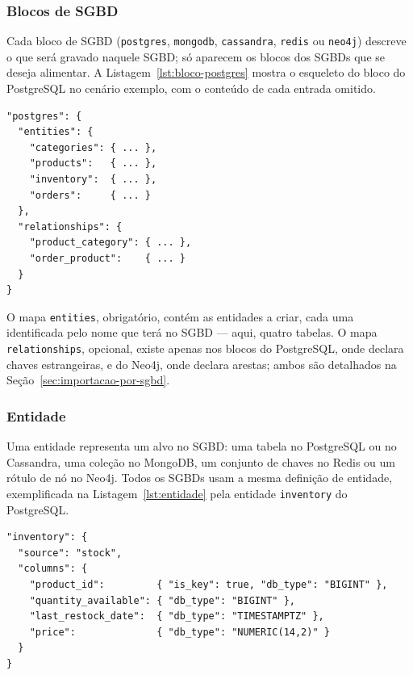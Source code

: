 \subsubsection{Blocos de SGBD}
\label{sec:blocos-sgbd}

Cada bloco de SGBD (\texttt{postgres}, \texttt{mongodb}, \texttt{cassandra},
\texttt{redis} ou \texttt{neo4j}) descreve o que será gravado naquele SGBD; só aparecem os
blocos dos SGBDs que se deseja alimentar. A Listagem~\ref{lst:bloco-postgres} mostra o
esqueleto do bloco do PostgreSQL no cenário exemplo, com o conteúdo de cada entrada
omitido.

\begin{lstlisting}[style=jsonstyle,caption={Esqueleto do bloco \texttt{postgres} do arquivo de importação.},label={lst:bloco-postgres}]
"postgres": {
  "entities": {
    "categories": { ... },
    "products":   { ... },
    "inventory":  { ... },
    "orders":     { ... }
  },
  "relationships": {
    "product_category": { ... },
    "order_product":    { ... }
  }
}
\end{lstlisting}

O mapa \texttt{entities}, obrigatório, contém as entidades a criar, cada uma identificada
pelo nome que terá no SGBD --- aqui, quatro tabelas. O mapa \texttt{relationships},
opcional, existe apenas nos blocos do PostgreSQL, onde declara chaves estrangeiras, e do
Neo4j, onde declara arestas; ambos são detalhados na Seção~\ref{sec:importacao-por-sgbd}.

\subsubsection{Entidade}
\label{sec:entidade}

Uma entidade representa um alvo no SGBD: uma tabela no PostgreSQL ou no Cassandra, uma
coleção no MongoDB, um conjunto de chaves no Redis ou um rótulo de nó no Neo4j. Todos os
SGBDs usam a mesma definição de entidade, exemplificada na Listagem~\ref{lst:entidade}
pela entidade \texttt{inventory} do PostgreSQL.

\begin{lstlisting}[style=jsonstyle,caption={Entidade \texttt{inventory} do arquivo de importação.},label={lst:entidade}]
"inventory": {
  "source": "stock",
  "columns": {
    "product_id":         { "is_key": true, "db_type": "BIGINT" },
    "quantity_available": { "db_type": "BIGINT" },
    "last_restock_date":  { "db_type": "TIMESTAMPTZ" },
    "price":              { "db_type": "NUMERIC(14,2)" }
  }
}
\end{lstlisting}

